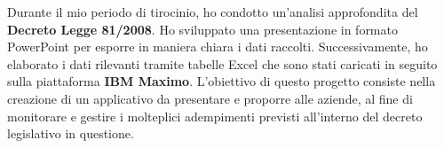 \documentclass[10pt,a4paper]{altacv}
\begin{document}




    
Durante il mio periodo di tirocinio, ho condotto un'analisi approfondita del \textbf{Decreto Legge 81/2008}. Ho sviluppato
 una presentazione in formato PowerPoint per esporre in maniera chiara i dati raccolti. Successivamente, ho
 elaborato i dati rilevanti tramite tabelle Excel che sono stati caricati in seguito sulla piattaforma \textbf{IBM Maximo}.
 L'obiettivo di questo progetto consiste nella creazione di un applicativo da presentare e proporre alle aziende, al
 fine di monitorare e gestire i molteplici adempimenti previsti all'interno del decreto legislativo in questione.
\end{document}
